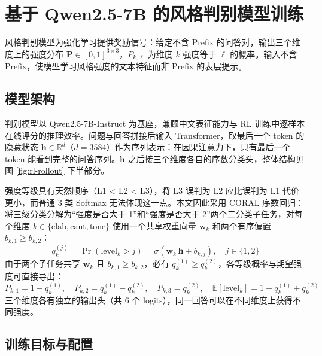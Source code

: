 \documentclass[fontset=fandol,type=master,campus=shenzhen,etitleauto=true]{hithesisbook}
\begin{document}
\section{基于 Qwen2.5-7B 的风格判别模型训练}\label{ux57faux4e8e-qwen2.5-7b-ux7684ux98ceux683cux5224ux522bux6a21ux578bux8badux7ec3}

风格判别模型为强化学习提供奖励信号：给定不含 Prefix 的问答对，输出三个维度上的强度分布 $\mathbf{P} \in [0,1]^{3 \times 3}$，$P_{k,\ell}$ 为维度 $k$ 强度等于 $\ell$ 的概率。输入不含 Prefix，使模型学习风格强度的文本特征而非 Prefix 的表层提示。

\subsection{模型架构}\label{ux6a21ux578bux67b6ux6784ux8bbeux8ba1}

判别模型以 Qwen2.5-7B-Instruct 为基座，兼顾中文表征能力与 RL 训练中逐样本在线评分的推理效率。问题与回答拼接后输入 Transformer，取最后一个 token 的隐藏状态 $\mathbf{h} \in \mathbb{R}^{d}$（$d = 3584$）作为序列表示：在因果注意力下，只有最后一个 token 能看到完整的问答序列。$\mathbf{h}$ 之后接三个维度各自的序数分类头，整体结构见图 \ref{fig:rl-rollout} 下半部分。

强度等级具有天然顺序（L1 < L2 < L3），将 L3 误判为 L2 应比误判为 L1 代价更小，而普通 3 类 Softmax 无法体现这一点。本文因此采用 CORAL 序数回归\cite{ref86}：将三级分类分解为“强度是否大于 1”和“强度是否大于 2”两个二分类子任务，对每个维度 $k \in \{\text{elab}, \text{caut}, \text{tone}\}$ 使用一个共享权重向量 $\mathbf{w}_k$ 和两个有序偏置 $b_{k,1} \ge b_{k,2}$：
\begin{equation}
q_k^{(j)} = \Pr(\text{level}_k > j) = \sigma\!\left(\mathbf{w}_k^{\top}\mathbf{h} + b_{k,j}\right), \quad j \in \{1, 2\}
\end{equation}
由于两个子任务共享 $\mathbf{w}_k$ 且 $b_{k,1} \ge b_{k,2}$，必有 $q_k^{(1)} \ge q_k^{(2)}$，各等级概率与期望强度可直接导出：
\begin{equation}
P_{k,1} = 1 - q_k^{(1)}, \quad P_{k,2} = q_k^{(1)} - q_k^{(2)}, \quad P_{k,3} = q_k^{(2)}, \quad \mathbb{E}[\text{level}_k] = 1 + q_k^{(1)} + q_k^{(2)}
\end{equation}
三个维度各有独立的输出头（共 6 个 logits），同一回答可以在不同维度上获得不同强度。

\subsection{训练目标与配置}\label{ux8badux7ec3ux76eeux6807ux4e0eux4f18ux5316ux914dux7f6e-1}
\end{document}
